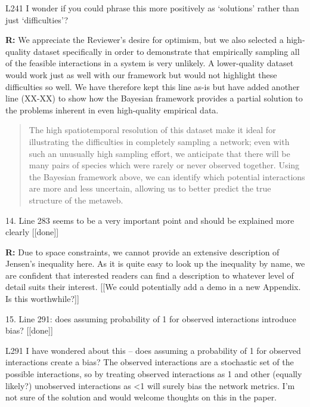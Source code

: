 \documentclass[12pt]{letter}
\newenvironment{refquote}{\bigskip \begin{it}}{\end{it}\smallskip}
\begin{document}
		\begin{refquote}
		L241 I wonder if you could phrase this more positively as ‘solutions’ rather than just ‘difficulties’?
		\end{refquote}

		\textbf{R:} We appreciate the Reviewer's desire for optimism, but we also selected a high-quality dataset specifically in order to demonstrate that empirically sampling all of the feasible interactions in a system is very unlikely. A lower-quality dataset would work just as well with our framework but would not highlight these difficulties so well. We have therefore kept this line as-is but have added another line (XX-XX) to show how the Bayesian framework provides a partial solution to the problems inherent in even high-quality empirical data.

		\begin{quotation}
		 The high spatiotemporal resolution of this dataset make it ideal for illustrating the difficulties in completely sampling a network; even with such an unusually high sampling effort, we anticipate that there will be many pairs of species which were rarely or never observed together. Using the Bayesian framework above, we can identify which potential interactions are more and less uncertain, allowing us to better predict the true structure of the metaweb.
		 \end{quotation}


	14. Line 283 seems to be a very important point and should be explained more clearly [[done]]

		\textbf{R:} Due to space constraints, we cannot provide an extensive description of Jensen's inequality here. As it is quite easy to look up the inequality by name, we are confident that interested readers can find a description to whatever level of detail suits their interest. 
		[[We could potentially add a demo in a new Appendix. Is this worthwhile?]]


	15. Line 291: does assuming probability of 1 for observed interactions introduce bias? [[done]]

		\begin{refquote}
		L291 I have wondered about this – does assuming a probability of 1 for observed interactions create a bias? The observed interactions are a stochastic set of the possible interactions, so by treating observed interactions as 1 and other (equally likely?) unobserved interactions as <1 will surely bias the network metrics. I’m not sure of the solution and would welcome thoughts on this in the paper.
		\end{refquote}
\end{document}
